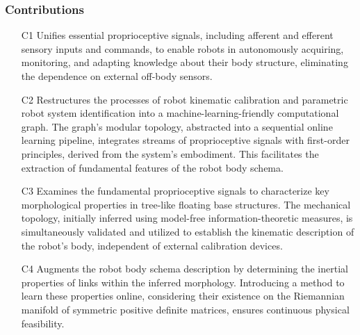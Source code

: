 \documentclass[12pt, a4paper]{article}
\begin{document}
\subsubsection*{Contributions}
\begin{itemize}
\item[C1] Unifies essential proprioceptive signals, including afferent and efferent sensory inputs and commands, to enable robots in autonomously acquiring, monitoring, and adapting knowledge about their body structure, eliminating the dependence on external off-body sensors.
\item[C2] Restructures the processes of robot kinematic calibration and parametric robot system identification into a machine-learning-friendly computational graph. The graph's modular topology, abstracted into a sequential online learning pipeline, integrates streams of proprioceptive signals with first-order principles, derived from the system's embodiment. This facilitates the extraction of fundamental features of the robot body schema.
\item[C3]  Examines the fundamental proprioceptive signals to characterize key morphological properties in tree-like floating base structures. The mechanical topology, initially inferred using model-free information-theoretic measures, is simultaneously validated and utilized to establish the kinematic description of the robot's body, independent of external calibration devices.
\item[C4] Augments the robot body schema description by determining the inertial properties of links within the inferred morphology. Introducing a method to learn these properties online, considering their existence on the Riemannian manifold of symmetric positive definite matrices, ensures continuous physical feasibility.
\end{itemize}
\end{document}

